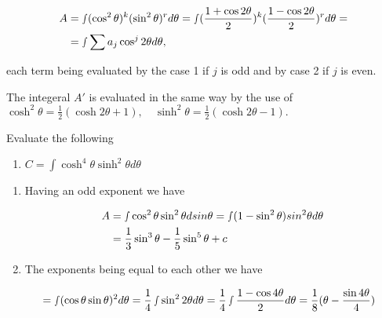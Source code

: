 \documentclass[11pt]{amsbook}
\begin{document}
	\begin{align*}
		A &
		= \smallint(\cos^{2}\theta)^k(\sin^{2}\theta)^r d\theta = \smallint (\frac{1+\cos 2\theta}{2})^k (\frac{1-\cos 2\theta}{2})^r d\theta =\\
		&=\smallint\sum a_{j} \cos^j 2\theta d\theta,
	\end{align*}
	
	each term being evaluated by the case 1 if $j$ is odd and by case 2 if $j$ is even.
	\par The integeral $A'$ is evaluated in the same way by the use of $\cosh^2 \theta = \frac{1}{2} (\cosh 2\theta + 1), \hspace{12pt}\sinh^2\theta = \frac {1}{2}(\cosh 2\theta -1). $


	\begin{exmp}
		Evaluate the following

	\begin{enumerate}[label=\alph*)]
			
		
			\item $C= \int \cosh^4 \theta \sinh^2 \theta d\theta$
	
	\end{enumerate}

	\end{exmp}

	\begin{hSolution}
		
		\begin{enumerate}[label=\alph*)]
	
			\item Having an odd exponent we have
	
		\begin{align*}	
			A& =\smallint \cos^2 \theta \sin^2 \theta dsin\theta = \smallint(1-\sin^2\theta)sin^2 \theta d\theta\\
			&=\frac{1}{3} \sin^3 \theta - \frac{1}{5} \sin^5 \theta + c
		\end{align*}
		
			\item The exponents being equal to each other we have
		
		\begin{align*}	
			& =\smallint(\cos\theta \sin\theta)^2 d\theta = \frac{1}{4}\smallint \sin^2 2\theta d\theta = \frac{1}{4}\smallint\frac{1-\cos4\theta}{2} d\theta = \frac {1}{8}(\theta-\frac{\sin4\theta}{4})
		\end{align*}
	
		\end{enumerate}
	\end{hSolution}
\end{document}
